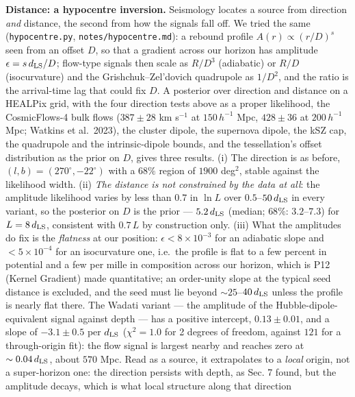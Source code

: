 \documentclass[
  11pt,
]{article}
\begin{document}
\textbf{Distance: a hypocentre inversion.} Seismology locates a source
from direction \emph{and} distance, the second from how the signals fall
off. We tried the same (\texttt{hypocentre.py},
\texttt{notes/hypocentre.md}): a rebound profile
\(A(r) \propto (r/D)^s\) seen from an offset \(D\), so that a gradient
across our horizon has amplitude \(\epsilon = s\,d_{\rm LS}/D\);
flow-type signals then scale as \(R/D^3\) (adiabatic) or \(R/D\)
(isocurvature) and the Grishchuk--Zel'dovich quadrupole as \(1/D^2\),
and the ratio is the arrival-time lag that could fix \(D\). A posterior
over direction and distance on a HEALPix grid, with the four direction
tests above as a proper likelihood, the CosmicFlows-4 bulk flows
(\(387 \pm 28\) km s\(^{-1}\) at \(150\,h^{-1}\) Mpc, \(428 \pm 36\) at
\(200\,h^{-1}\) Mpc; Watkins et al.~2023), the cluster dipole, the
supernova dipole, the kSZ cap, the quadrupole and the intrinsic-dipole
bounds, and the tessellation's offset distribution as the prior on
\(D\), gives three results. (i) The direction is as before,
\((l,b) = (270^\circ, -22^\circ)\) with a \(68\%\) region of \(1900\)
deg\(^2\), stable against the likelihood width. (ii) \emph{The distance
is not constrained by the data at all}: the amplitude likelihood varies
by less than \(0.7\) in \(\ln L\) over \(0.5\)--\(50\,d_{\rm LS}\) in
every variant, so the posterior on \(D\) is the prior ---
\(5.2\,d_{\rm LS}\) (median; \(68\%\): \(3.2\)--\(7.3\)) for
\(L = 8\,d_{\rm LS}\), consistent with \(0.7\,L\) by construction only.
(iii) What the amplitudes do fix is the \emph{flatness} at our position:
\(\epsilon < 8\times10^{-3}\) for an adiabatic slope and
\(< 5\times10^{-4}\) for an isocurvature one, i.e.~the profile is flat
to a few percent in potential and a few per mille in composition across
our horizon, which is P12 (Kernel Gradient) made quantitative; an
order-unity slope at the typical seed distance is excluded, and the seed
must lie beyond \(\sim 25\)--\(40\,d_{\rm LS}\) unless the profile is
nearly flat there. The Wadati variant --- the amplitude of the
Hubble-dipole-equivalent signal against depth --- has a positive
intercept, \(0.13 \pm 0.01\), and a slope of \(-3.1 \pm 0.5\) per
\(d_{\rm LS}\) (\(\chi^2 = 1.0\) for 2 degrees of freedom, against
\(121\) for a through-origin fit): the flow signal is largest nearby and
reaches zero at \(\sim 0.04\,d_{\rm LS}\), about \(570\) Mpc. Read as a
source, it extrapolates to a \emph{local} origin, not a super-horizon
one: the direction persists with depth, as Sec. 7 found, but the
amplitude decays, which is what local structure along that direction
\end{document}
